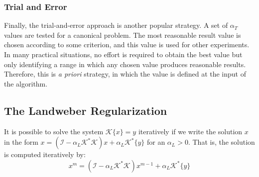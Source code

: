 			\subsubsection{Trial and Error}\label{chap:methods:linear:tikhonov:trialanderror}
				
				Finally, the trial-and-error approach is another popular strategy. A set of $\alpha_T$ values are tested for a canonical problem. The most reasonable result value is chosen according to some criterion, and this value is used for other experiments. In many practical situations, no effort is required to obtain the best value but only identifying a range in which any chosen value produces reasonable results. Therefore, this is \textit{a priori} strategy, in which the value is defined at the input of the algorithm. 
				
		\subsection{The Landweber Regularization}\label{chap:methods:linear:landweber}
				
			It is possible to solve the system $\mathcal{K}\{x\}=y$ iteratively if we write the solution $x$ in the form $x=(\mathcal{I}-\alpha_L\mathcal{K}^*\mathcal{K})x+ \alpha_L \mathcal{K}^*\{y\}$ for an $\alpha_L > 0$. That is, the solution is computed iteratively by:
			\begin{equation}
				x^m=(\mathcal{I}-\alpha_L\mathcal{K}^*\mathcal{K})x^{m-1}+ \alpha_L \mathcal{K}^*\{y\} \label{eq:3:linear:landweber:0}
			\end{equation}
		
